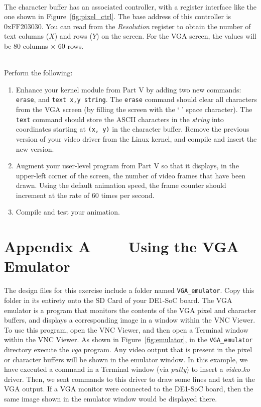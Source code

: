 \documentclass[epsfig,10pt,fullpage]{article}
\begin{document}
~\\
\noindent
The character buffer has an associated controller, with a
register interface like the one shown in Figure~\ref{fig:pixel_ctrl}. The base address of
this controller is {\sf 0xFF203030}.  You can read from the
{\it Resolution} register to obtain the number of text columns ($X$) and rows ($Y$) on
the screen. For the VGA screen, the values will be 80 columns $\times$ 60 rows.

~\\
\noindent
Perform the following:

\begin{enumerate}
\item Enhance your kernel module from Part V by adding two new commands: \texttt{erase}, and 
\texttt{text x,y string}. The \texttt{erase} command should clear all characters from the VGA 
screen (by filling the screen with the ` ' space character).
The \texttt{text} command should store the ASCII characters in the {\it string} into coordinates
starting at \texttt{(x, y)} in the character buffer. Remove the previous version of your 
video driver from the Linux kernel, and compile and insert the new version.
\item Augment your user-level program from Part V so that it displays, in the upper-left corner 
of the screen, the number of video frames that have been drawn. Using the default animation speed,
the frame counter should increment at the rate of 60 times per second.
\item Compile and test your animation.
\end{enumerate}

\newpage
\section*{Appendix A~~~~ Using the VGA Emulator}

The design files for this exercise include a folder named \texttt{VGA\_emulator}. Copy
this folder in its entirety onto the SD Card of your DE1-SoC board. The VGA emulator is a
program that monitors the contents of the VGA pixel and character buffers, and displays a
corresponding image in a window within the VNC Viewer. To use this program, open the VNC
Viewer, and then open a Terminal window within the VNC Viewer. As shown in
Figure~\ref{fig:emulator}, in
the \texttt{VGA\_emulator} directory execute the {\it vga} program. Any video output that
is present in the pixel or character buffers will be shown in the emulator window. In this
example, we have executed a command in a Terminal window (via {\it putty}) to insert a 
{\it video.ko} driver. Then, we sent commands to this driver to draw some lines and text in 
the VGA output. If a VGA monitor were connected to the DE1-SoC board, then the same image 
shown in the emulator window would be displayed there. 
\end{document}
